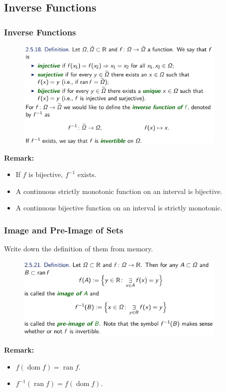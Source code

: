 \documentclass[10pt, t]{beamer}
\newcommand{\dom}{\operatorname{dom}}
\begin{document}
\subsection{Inverse Functions}
\begin{frame}
    \frametitle{Inverse Functions}
    \begin{figure}[H]
        \centering
        \includegraphics[width=0.9\textwidth]{2020-10-28-11-06-58.png}
    \end{figure}
    \textbf{Remark:}
    \begin{itemize}
        \item
              If $f$ is bijective, $f^{-1}$ exists.
        \item A continuous strictly monotonic function on an interval is bijective.
        \item A continuous bijective function on an interval is strictly monotonic.
    \end{itemize}
\end{frame}

\begin{frame}
    \frametitle{Image and Pre-Image of Sets}

    Write down the definition of them from memory.
    \pause
    \begin{figure}[H]
        \centering
        \includegraphics[width=0.9\textwidth]{2020-10-28-12-26-27.png}
    \end{figure}
    \textbf{Remark:}
    \begin{itemize}
        \item
              $f(\dom f)=\operatorname{ran} f$.
        \item $f^{-1}(\operatorname{ran} f)=f(\dom f)$.
    \end{itemize}
\end{frame}
\end{document}

